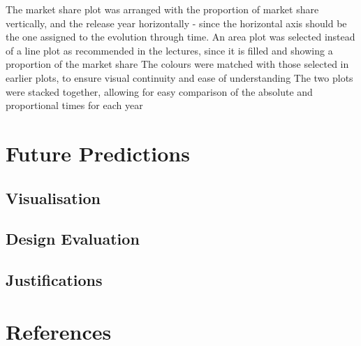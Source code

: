 \documentclass[conference]{IEEEtran}
\begin{document}
The market share plot was arranged with the proportion of market share vertically, and the release year horizontally - since the horizontal axis should be the one assigned to the evolution through time. An area plot was selected instead of a line plot as recommended in the lectures, since it is filled and showing a proportion of the market share
The colours were matched with those selected in earlier plots, to ensure visual continuity and ease of understanding
The two plots were stacked together, allowing for easy comparison of the absolute and proportional times for each year

\section{Future Predictions}

\subsection{Visualisation}

\subsection{Design Evaluation}

\subsection{Justifications}

\section*{References}
\end{document}
